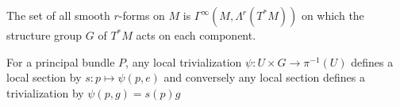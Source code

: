 		
		\begin{eg}
			The set of all smooth $r$-forms on $M$ is $\Gamma^\infty(M, \Lambda^r (T^* M))$ on which the structure group $G$ of $T^*M$ acts on each component. %
		\end{eg}
		
		\begin{prop}
			For a principal bundle $P$, any local trivialization $\psi: U \times G \rightarrow \pi^{-1} (U)$ defines a local section by $s: p \mapsto \psi(p, e)$ and conversely any local section defines a trivialization by $\psi(p,g) = s(p) g$
		\end{prop}
		
		
